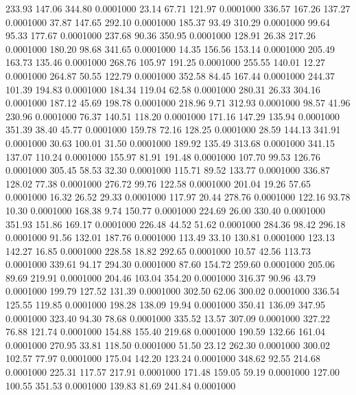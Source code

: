  233.93  147.06  344.80   0.0001000
  23.14   67.71  121.97   0.0001000
 336.57  167.26  137.27   0.0001000
  37.87  147.65  292.10   0.0001000
 185.37   93.49  310.29   0.0001000
  99.64   95.33  177.67   0.0001000
 237.68   90.36  350.95   0.0001000
 128.91   26.38  217.26   0.0001000
 180.20   98.68  341.65   0.0001000
  14.35  156.56  153.14   0.0001000
 205.49  163.73  135.46   0.0001000
 268.76  105.97  191.25   0.0001000
 255.55  140.01   12.27   0.0001000
 264.87   50.55  122.79   0.0001000
 352.58   84.45  167.44   0.0001000
 244.37  101.39  194.83   0.0001000
 184.34  119.04   62.58   0.0001000
 280.31   26.33  304.16   0.0001000
 187.12   45.69  198.78   0.0001000
 218.96    9.71  312.93   0.0001000
  98.57   41.96  230.96   0.0001000
  76.37  140.51  118.20   0.0001000
 171.16  147.29  135.94   0.0001000
 351.39   38.40   45.77   0.0001000
 159.78   72.16  128.25   0.0001000
  28.59  144.13  341.91   0.0001000
  30.63  100.01   31.50   0.0001000
 189.92  135.49  313.68   0.0001000
 341.15  137.07  110.24   0.0001000
 155.97   81.91  191.48   0.0001000
 107.70   99.53  126.76   0.0001000
 305.45   58.53   32.30   0.0001000
 115.71   89.52  133.77   0.0001000
 336.87  128.02   77.38   0.0001000
 276.72   99.76  122.58   0.0001000
 201.04   19.26   57.65   0.0001000
  16.32   26.52   29.33   0.0001000
 117.97   20.44  278.76   0.0001000
 122.16   93.78   10.30   0.0001000
 168.38    9.74  150.77   0.0001000
 224.69   26.00  330.40   0.0001000
 351.93  151.86  169.17   0.0001000
 226.48   44.52   51.62   0.0001000
 284.36   98.42  296.18   0.0001000
  91.56  132.01  187.76   0.0001000
 113.49   33.10  130.81   0.0001000
 123.13  142.27   16.85   0.0001000
 228.58   18.82  292.65   0.0001000
  10.57   42.56  113.73   0.0001000
 339.61   94.17  294.30   0.0001000
  87.60  154.72  259.60   0.0001000
 205.06   89.69  219.91   0.0001000
 204.46  103.04  354.20   0.0001000
 316.37   90.96   43.79   0.0001000
 199.79  127.52  131.39   0.0001000
 302.50   62.06  300.02   0.0001000
 336.54  125.55  119.85   0.0001000
 198.28  138.09   19.94   0.0001000
 350.41  136.09  347.95   0.0001000
 323.40   94.30   78.68   0.0001000
 335.52   13.57  307.09   0.0001000
 327.22   76.88  121.74   0.0001000
 154.88  155.40  219.68   0.0001000
 190.59  132.66  161.04   0.0001000
 270.95   33.81  118.50   0.0001000
  51.50   23.12  262.30   0.0001000
 300.02  102.57   77.97   0.0001000
 175.04  142.20  123.24   0.0001000
 348.62   92.55  214.68   0.0001000
 225.31  117.57  217.91   0.0001000
 171.48  159.05   59.19   0.0001000
 127.00  100.55  351.53   0.0001000
 139.83   81.69  241.84   0.0001000
